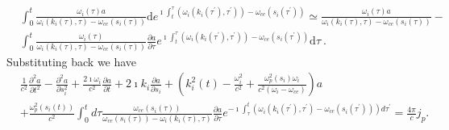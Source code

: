 \begin{equation}
    \begin{aligned}
    &\int_0^t  \frac{\omega_i(\tau) a}{\omega_i(k_i(\tau),\tau) - \omega_{ce}(s_i(\tau))} \mathrm{d}e^{\imath \int_t^\tau (\omega_i(k_i(\tau^\prime),\tau^\prime)) - \omega_{ce}(s_i(\tau^\prime))} \simeq \frac{\omega_i(\tau) a}{\omega_i(k_i(\tau),\tau) - \omega_{ce}(s_i(\tau))} -
    \\
    &\int_0^t \frac{\omega_i(\tau)}{\omega_i(k_i(\tau),\tau) - \omega_{ce}(s_i(\tau))} \frac{\partial a}{\partial \tau} e^{\imath \int_t^\tau (\omega_i(k_i(\tau^\prime),\tau^\prime)) - \omega_{ce}(s_i(\tau^\prime))}\mathrm{d} \tau ~.
    \end{aligned}
\end{equation}
Substituting back we have
\begin{equation}
    \begin{aligned}
    & \frac{1}{c^2} \frac{\partial^2 a}{\partial t^2}-\frac{\partial^2 a}{\partial s_i^2}+\frac{2 \imath \omega_i}{c^2} \frac{\partial a}{\partial t}+2 \imath k_i \frac{\partial a}{\partial s_i}+\left(k_i^2(t)-\frac{\omega_i^2}{c^2}+\frac{\omega_p^2\left(s_i\right) \omega_i}{c^2\left(\omega_i-\omega_{c e}\right)}\right) a \\
    & +\frac{\omega_p^2\left(s_i(t)\right)}{c^2} \int_0^t d \tau \frac{\omega_{c e}\left(s_i(\tau)\right)}{\omega_{c e}\left(s_i(\tau)\right)-\omega_i\left(k_i(\tau), \tau\right)} \frac{\partial a}{\partial \tau} e^{-\imath \int_\tau^t\left(\omega_i\left(k_i\left(\tau^{\prime}\right), \tau^{\prime}\right)-\omega_{c e}\left(s_i\left(\tau^{\prime}\right)\right)\right) d \tau^{\prime}} =\frac{4\pi}{c} j_{p}.
    \end{aligned}
\end{equation}

